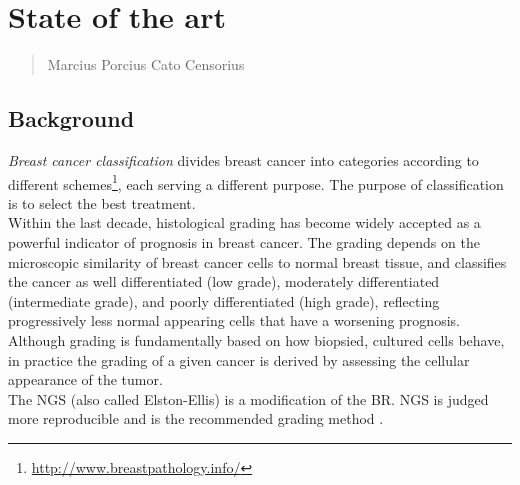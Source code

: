 \chapter{State of the art}
\label{chapter2}
\thispagestyle{empty}

\begin{quotation}
{\footnotesize
{}
\begin{flushright}
Marcius Porcius Cato Censorius
\end{flushright}
}
\end{quotation}
\vspace{1.5cm}


\section{Background}

\indent \textit{Breast cancer classification} divides breast cancer into categories according to different schemes\footnote{\url{http://www.breastpathology.info/}}, each serving a different purpose.
The purpose of classification is to select the best treatment\cite{Genestie2011}.\\
Within the last decade, histological grading has become widely accepted as a powerful indicator of prognosis in breast cancer. 
The grading depends on the microscopic similarity of breast cancer cells to normal breast tissue, and classifies the cancer as well differentiated (low grade),
moderately differentiated (intermediate grade), and poorly differentiated (high grade), reflecting progressively less normal appearing cells that have a worsening prognosis.
Although grading is fundamentally based on how biopsied, cultured cells behave, in practice the grading of a given cancer is derived by assessing the cellular appearance of the tumor.\\
The \Gls{NGS} (also called Elston-Ellis) is a modification \cite{breastCancerGrading01} of the \Gls{BR}\cite{BRgrading01, BRgenestie}. \Gls{NGS}
is judged more reproducible and is the recommended grading method \cite{NGSrecommended}.


